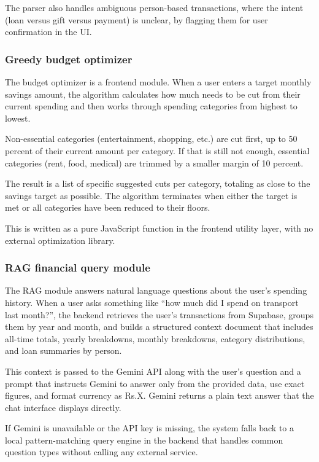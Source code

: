 \documentclass[12pt, a4paper]{article}
\begin{document}
The parser also handles ambiguous person-based transactions, where the intent (loan versus gift versus payment) is unclear, by flagging them for user confirmation in the UI.

\subsubsection{Greedy budget optimizer}

The budget optimizer is a frontend module. When a user enters a target monthly savings amount, the algorithm calculates how much needs to be cut from their current spending and then works through spending categories from highest to lowest.

Non-essential categories (entertainment, shopping, etc.) are cut first, up to 50 percent of their current amount per category. If that is still not enough, essential categories (rent, food, medical) are trimmed by a smaller margin of 10 percent.

The result is a list of specific suggested cuts per category, totaling as close to the savings target as possible. The algorithm terminates when either the target is met or all categories have been reduced to their floors.

This is written as a pure JavaScript function in the frontend utility layer, with no external optimization library.

\subsubsection{RAG financial query module}

The RAG module answers natural language questions about the user's spending history. When a user asks something like ``how much did I spend on transport last month?'', the backend retrieves the user's transactions from Supabase, groups them by year and month, and builds a structured context document that includes all-time totals, yearly breakdowns, monthly breakdowns, category distributions, and loan summaries by person.

This context is passed to the Gemini API along with the user's question and a prompt that instructs Gemini to answer only from the provided data, use exact figures, and format currency as Rs.X. Gemini returns a plain text answer that the chat interface displays directly.

If Gemini is unavailable or the API key is missing, the system falls back to a local pattern-matching query engine in the backend that handles common question types without calling any external service.
\end{document}
